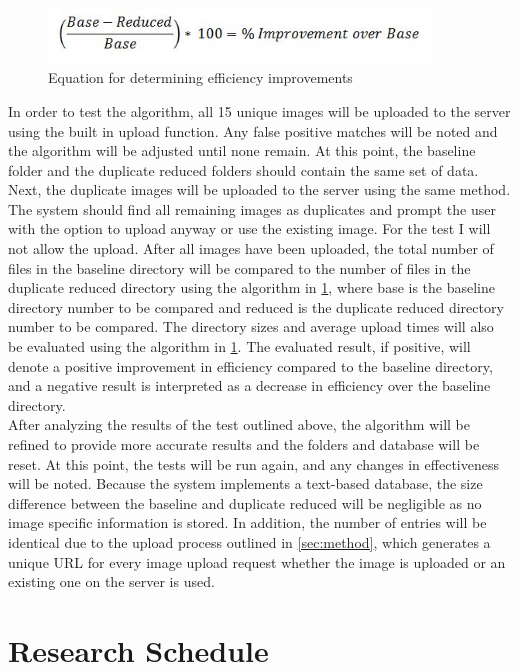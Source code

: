 \documentclass[11pt]{article}
\begin{document}
\begin{figure}[htbp]
\centering
\includegraphics[width=4in]{benchmark_eq}
\caption{Equation for determining efficiency improvements}
\label{benchmark_eq}
\end{figure}

In order to test the algorithm, all 15 unique images will be uploaded to the server using the built in upload function. Any false positive matches will be noted and the algorithm will be adjusted until none remain. At this point, the baseline folder and the duplicate reduced folders should contain the same set of data. Next, the duplicate images will be uploaded to the server using the same method. The system should find all remaining images as duplicates and prompt the user with the option to upload anyway or use the existing image. For the test I will not allow the upload. After all images have been uploaded, the total number of files in the baseline directory will be compared to the number of files in the duplicate reduced directory using the algorithm in \ref{benchmark_eq}, where base is the baseline directory number to be compared and reduced is the duplicate reduced directory number to be compared.  The directory sizes and average upload times will also be evaluated using the algorithm in \ref{benchmark_eq}. The evaluated result, if positive, will denote a positive improvement in efficiency compared to the baseline directory, and a negative result is interpreted as a decrease in efficiency over the baseline directory.\\

After analyzing the results of the test outlined above, the algorithm will be refined to provide more accurate results and the folders and database will be reset. At this point, the tests will be run again, and any changes in effectiveness will be noted. Because the system implements a text-based database, the size difference between the baseline and duplicate reduced will be negligible as no image specific information is stored. In addition, the number of entries will be identical due to the upload process outlined in \ref{sec:method}, which generates a unique URL for every image upload request whether the image is uploaded or an existing one on the server is used.

\vspace*{-.1in}
\section{Research Schedule}
\label{sec:schedule}
\vspace*{-.1in}
\end{document}
